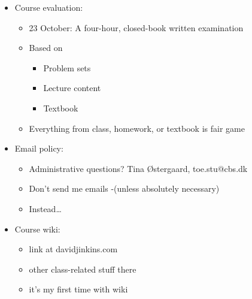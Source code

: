 \documentclass[ignorenonframetext,]{beamer}
\begin{document}
\begin{frame}

\begin{itemize}
\itemsep1pt\parskip0pt
\item
  Course evaluation:

  \begin{itemize}
  \itemsep1pt\parskip0pt
  \item
    23 October: A four-hour, closed-book written examination
  \item
    Based on

    \begin{itemize}
    \itemsep1pt\parskip0pt
    \item
      Problem sets
    \item
      Lecture content
    \item
      Textbook
    \end{itemize}
  \item
    Everything from class, homework, or textbook is fair game
  \end{itemize}
\end{itemize}

\end{frame}

\begin{frame}

\begin{itemize}
\itemsep1pt\parskip0pt
\item
  Email policy:

  \begin{itemize}
  \itemsep1pt\parskip0pt
  \item
    Administrative questions? Tina Østergaard, toe.stu@cbs.dk
  \item
    Don't send me emails -(unless absolutely necessary)
  \item
    Instead\ldots
  \end{itemize}
\end{itemize}

\end{frame}

\begin{frame}

\begin{itemize}
\itemsep1pt\parskip0pt
\item
  Course wiki:

  \begin{itemize}
  \itemsep1pt\parskip0pt
  \item
    link at davidjinkins.com
  \item
    other class-related stuff there
  \item
    it's my first time with wiki
  \end{itemize}
\end{itemize}

\end{frame}
\end{document}
